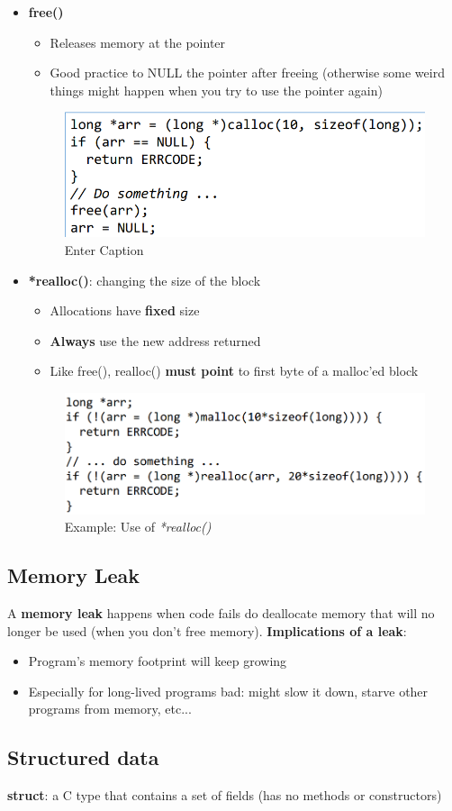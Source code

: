\documentclass[a4paper,10pt]{article}
\begin{document}
\begin{itemize}
    \item \textbf{free()}
    \begin{itemize}
    \item Releases memory at the pointer
    \item Good practice to NULL the pointer after freeing (otherwise some weird things might happen when you try to use the pointer again)
\end{itemize}
\begin{figure}
    \centering
    \includegraphics[width=0.75\linewidth]{Pictures/e24.png}
    \caption{Enter Caption}
    \label{fig:enter-label}
\end{figure}

\item \textbf{*realloc()}: changing the size of the block
    \begin{itemize}
        \item Allocations have \textbf{fixed} size
        \item \textbf{Always} use the new address returned
        \item Like free(), realloc() \textbf{must point} to first byte of a malloc’ed block
    \end{itemize}
    \begin{figure}[H]
        \centering
        \includegraphics[width=0.75\linewidth]{Pictures/e25.png}
        \caption{Example: Use of \textit{*realloc()}}
        \label{fig:enter-label}
    \end{figure}   
\end{itemize}
\subsection{Memory Leak}
A \textbf{memory leak} happens when code fails do deallocate memory that will no longer be used (when you don't free memory).
\textbf{Implications of a leak}:
\begin{itemize}
    \item Program’s memory footprint will keep growing
    \item Especially for long-lived programs bad: might slow it down, starve other programs from memory, etc...
\end{itemize}
\subsection{Structured data}
\textbf{struct}: a C type that contains a set of fields (has no methods or constructors)
\end{document}
